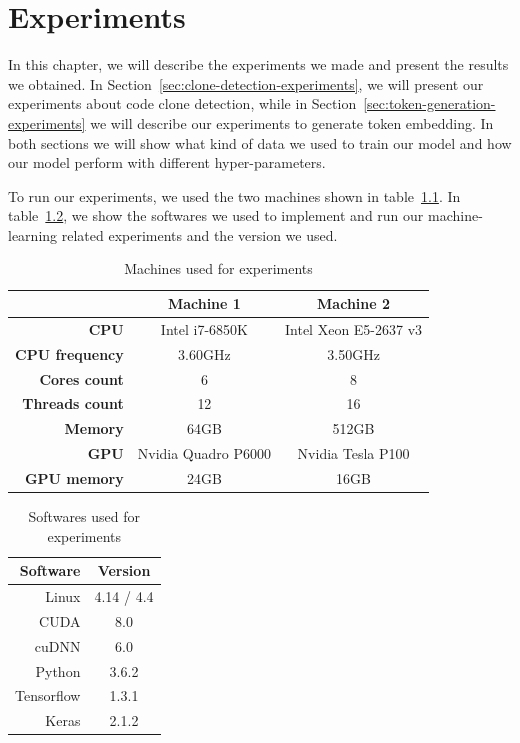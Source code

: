 \chapter{\label{ch:experiments}Experiments}
In this chapter, we will describe the experiments we made and present the
results we obtained. In Section~\ref{sec:clone-detection-experiments}, we will
present our experiments about code clone detection, while in
Section~\ref{sec:token-generation-experiments} we will describe our experiments
to generate token embedding. In both sections we will show what kind of data we
used to train our model and how our model perform with different
hyper-parameters.

To run our experiments, we used the two machines shown in
table~\ref{tab:machine-specs}. In table~\ref{tab:softwares}, we show the
softwares we used to implement and run our machine-learning related experiments
and the version we used.

\begin{table}
  \caption{\label{tab:machine-specs}Machines used for experiments}
  \begin{center}
    \begin{tabular}{r c c}
      \toprule
       & Machine 1 & Machine 2\\
      \toprule
      \textbf{CPU} & Intel i7-6850K & Intel Xeon E5-2637 v3\\
      \textbf{CPU frequency} & 3.60GHz & 3.50GHz\\
      \textbf{Cores count} & 6 & 8\\
      \textbf{Threads count} & 12 & 16\\
      \textbf{Memory} & 64GB & 512GB\\
      \textbf{GPU} & Nvidia Quadro P6000 & Nvidia Tesla P100\\
      \textbf{GPU memory} & 24GB & 16GB\\
      \bottomrule
    \end{tabular}
  \end{center}
\end{table}
%
\begin{table}
  \caption{\label{tab:softwares}Softwares used for experiments}
  \begin{center}
    \begin{tabular}{r c}
      \toprule
       Software & Version\\
      \toprule
      Linux & 4.14 / 4.4\\
      CUDA & 8.0\\
      cuDNN & 6.0\\
      Python & 3.6.2\\
      Tensorflow & 1.3.1\\
      Keras & 2.1.2\\
      \bottomrule
    \end{tabular}
  \end{center}
\end{table}
